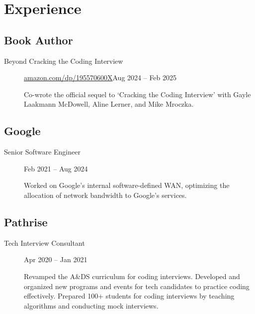\documentclass[letterpaper,10pt,oneside]{article}
\begin{document}
\section*{Experience}
\subsection*{Book Author}
\vspace{-3px}
\begin{description}
	\item[Beyond Cracking the Coding Interview]\quad \href{https://www.amazon.com/dp/195570600X}{amazon.com/dp/195570600X}\hfill Aug 2024 -- Feb 2025
	
	Co-wrote the official sequel to `Cracking the Coding Interview' with Gayle Laakmann McDowell, Aline Lerner, and Mike Mroczka.

\end{description}
\subsection*{Google}
\vspace{-3px}
\begin{description}
	\item[Senior Software Engineer]\hfill Feb 2021 -- Aug 2024
	
	Worked on Google's internal software-defined WAN, optimizing the allocation of network bandwidth to Google's services.	
	
\end{description}

\subsection*{Pathrise}
\vspace{-3px}
\begin{description}
	\item[Tech Interview Consultant]\hfill Apr 2020 -- Jan 2021
	
	Revamped the A\&DS curriculum for coding interviews. Developed and organized new programs and events for tech candidates to practice coding effectively. Prepared 100+ students for coding interviews by teaching algorithms and conducting mock interviews.
\end{description}
\end{document}
